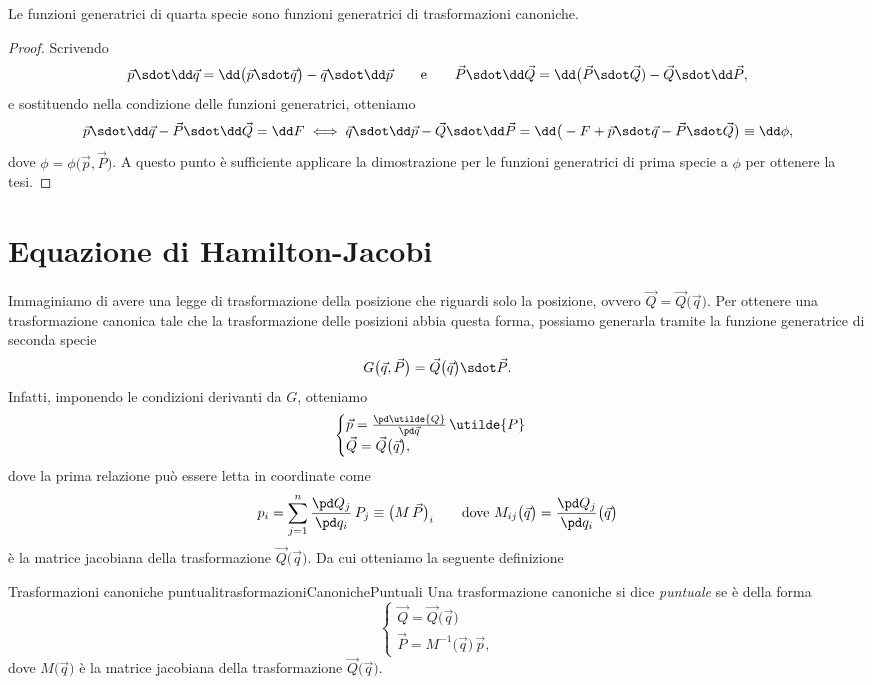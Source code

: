 \begin{pr}
	Le funzioni generatrici di quarta specie sono funzioni generatrici di trasformazioni canoniche.
\end{pr}

\begin{proof}
	Scrivendo
	\[
		\vec{p}\sdot \dd\vec{q} = \dd\big(\vec{p}\sdot \vec{q}\big) - \vec{q}\sdot\dd\vec{p} \qquad\text{e}\qquad \vec{P} \sdot \dd\vec{Q} = \dd\big(\vec{P}\sdot\vec{Q})-\vec{Q} \sdot \dd\vec{P},
	\]
	e sostituendo nella condizione delle funzioni generatrici, otteniamo
	\[
		\vec{p} \sdot \dd\vec{q} - \vec{P} \sdot \dd\vec{Q} = \dd F \iff \vec{q}\sdot \dd\vec{p} - \vec{Q}\sdot \dd\vec{P} = \dd\big(-F+\vec{p}\sdot\vec{q} - \vec{P}\sdot\vec{Q}\big) \equiv \dd\phi,
	\]
	dove \(\phi=\phi\big(\vec{p},\vec{P}\big)\).
	A questo punto è sufficiente applicare la dimostrazione per le funzioni generatrici di prima specie a \(\phi\) per ottenere la tesi.
\end{proof}

\section{Equazione di Hamilton-Jacobi}

Immaginiamo di avere una legge di trasformazione della posizione che riguardi solo la posizione, ovvero \(\vec{Q}=\vec{Q}\big(\vec{q}\big)\).
Per ottenere una trasformazione canonica tale che la trasformazione delle posizioni abbia questa forma, possiamo generarla tramite la funzione generatrice di seconda specie
\[
	G\big(\vec{q},\vec{P}\big) = \vec{Q}\big(\vec{q}\big) \sdot \vec{P}.
\]
Infatti, imponendo le condizioni derivanti da \(G\), otteniamo
\[
	\begin{cases}
		\vec{p} = \frac{\pd\utilde{Q}}{\pd\vec{q}} \, \utilde{P} \\
		\vec{Q} = \vec{Q}\big(\vec{q}\big),
	\end{cases}
\]
dove la prima relazione può essere letta in coordinate come
\[
	p_i = \sum_{j=1}^n \frac{\pd Q_j}{\pd q_i}\,P_j \equiv {\big(M\,\vec{P}\big)}_i \qquad\text{dove }M_{ij}\big(\vec{q}\big) = \frac{\pd Q_j}{\pd q_i}\big(\vec{q}\big)
\]
è la matrice jacobiana della trasformazione \(\vec{Q}\big(\vec{q}\big)\). Da cui otteniamo la seguente definizione

\begin{defn}{Trasformazioni canoniche puntuali}{trasformazioniCanonichePuntuali}
	Una trasformazione canoniche si dice \emph{puntuale} se è della forma
	\[
		\begin{cases}
			\vec{Q} = \vec{Q}\big(\vec{q}\big) \\
			\vec{P} = M^{-1}\big(\vec{q}\big)\,\vec{p},
		\end{cases}
	\]
	dove \(M\big(\vec{q}\big)\) è la matrice jacobiana della trasformazione \(\vec{Q}\big(\vec{q}\big)\).
\end{defn}

